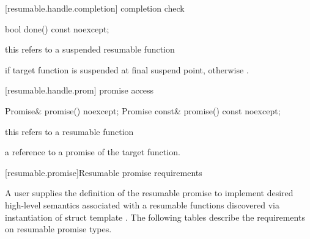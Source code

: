 [resumable.handle.completion]{ completion check}
\begin{itemdecl}
  bool done() const noexcept; 
\end{itemdecl}
\begin{itemdescr}
  \pnum
  \precondition *this refers to a suspended resumable function
  
  \pnum
  \returns {} if target function is suspended
  at final suspend point, otherwise .
\end{itemdescr}

[resumable.handle.prom]{ promise access}
\begin{itemdecl}
  Promise& promise() noexcept;		
  Promise const& promise() const noexcept;
\end{itemdecl}

\begin{itemdescr}
  \pnum
  \precondition *this refers to a resumable function
  
  \pnum
  \returns a reference to a promise of the target function.
\end{itemdescr}


[resumable.promise]{Resumable promise requirements}

\pnum
A user supplies the definition of the resumable promise to implement 
desired high-level semantics associated with a resumable functions
discovered via instantiation of struct template .
The following tables describe the requirements on
resumable promise types.


